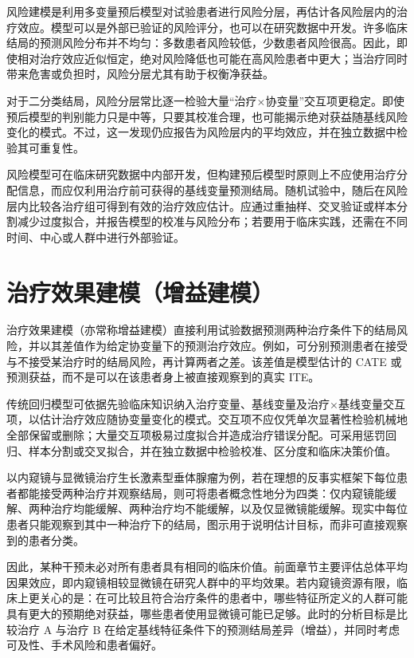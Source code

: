 \documentclass[
  chinese-hans,
  letterpaper,
  DIV=11,
  numbers=noendperiod]{scrreprt}
\begin{document}
风险建模是利用多变量预后模型对试验患者进行风险分层，再估计各风险层内的治疗效应。模型可以是外部已验证的风险评分，也可以在研究数据中开发。许多临床结局的预测风险分布并不均匀：多数患者风险较低，少数患者风险很高。因此，即使相对治疗效应近似恒定，绝对风险降低也可能在高风险患者中更大；当治疗同时带来危害或负担时，风险分层尤其有助于权衡净获益。

对于二分类结局，风险分层常比逐一检验大量``治疗×协变量''交互项更稳定。即使预后模型的判别能力只是中等，只要其校准合理，也可能揭示绝对获益随基线风险变化的模式。不过，这一发现仍应报告为风险层内的平均效应，并在独立数据中检验其可重复性。

风险模型可在临床研究数据中内部开发，但构建预后模型时原则上不应使用治疗分配信息，而应仅利用治疗前可获得的基线变量预测结局。随机试验中，随后在风险层内比较各治疗组可得到有效的治疗效应估计。应通过重抽样、交叉验证或样本分割减少过度拟合，并报告模型的校准与风险分布；若要用于临床实践，还需在不同时间、中心或人群中进行外部验证。

\section{治疗效果建模（增益建模）}\label{ux6cbbux7597ux6548ux679cux5efaux6a21ux589eux76caux5efaux6a21}

治疗效果建模（亦常称增益建模）直接利用试验数据预测两种治疗条件下的结局风险，并以其差值作为给定协变量下的预测治疗效应。例如，可分别预测患者在接受与不接受某治疗时的结局风险，再计算两者之差。该差值是模型估计的
CATE 或预测获益，而不是可以在该患者身上被直接观察到的真实 ITE。

传统回归模型可依据先验临床知识纳入治疗变量、基线变量及治疗×基线变量交互项，以估计治疗效应随协变量变化的模式。交互项不应仅凭单次显著性检验机械地全部保留或删除；大量交互项极易过度拟合并造成治疗错误分配。可采用惩罚回归、样本分割或交叉拟合，并在独立数据中检验校准、区分度和临床决策价值。

以内窥镜与显微镜治疗生长激素型垂体腺瘤为例，若在理想的反事实框架下每位患者都能接受两种治疗并观察结局，则可将患者概念性地分为四类：仅内窥镜能缓解、两种治疗均能缓解、两种治疗均不能缓解，以及仅显微镜能缓解。现实中每位患者只能观察到其中一种治疗下的结局，图示用于说明估计目标，而非可直接观察到的患者分类。

因此，某种干预未必对所有患者具有相同的临床价值。前面章节主要评估总体平均因果效应，即内窥镜相较显微镜在研究人群中的平均效果。若内窥镜资源有限，临床上更关心的是：在可比较且符合治疗条件的患者中，哪些特征所定义的人群可能具有更大的预期绝对获益，哪些患者使用显微镜可能已足够。此时的分析目标是比较治疗
A 与治疗 B
在给定基线特征条件下的预测结局差异（增益），并同时考虑可及性、手术风险和患者偏好。
\end{document}
